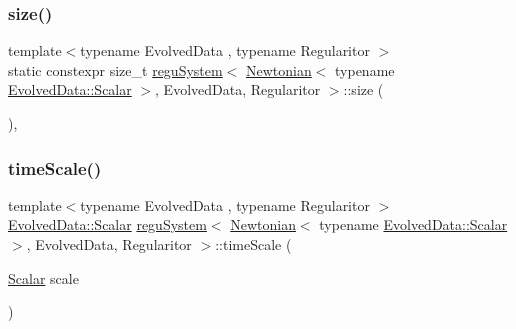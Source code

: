 \subsubsection{\texorpdfstring{size()}{size()}}
{\footnotesize\ttfamily template$<$typename Evolved\+Data , typename Regularitor $>$ \\
static constexpr size\+\_\+t \mbox{\hyperlink{classregu_system}{regu\+System}}$<$ \mbox{\hyperlink{class_newtonian}{Newtonian}}$<$ typename \mbox{\hyperlink{classregu_system_aca8ee2c387943164ee3ea68370fc3ac0}{Evolved\+Data\+::\+Scalar}} $>$, Evolved\+Data, Regularitor $>$\+::size (\begin{DoxyParamCaption}{ }\end{DoxyParamCaption})\hspace{0.3cm}{\ttfamily [inline]}, {\ttfamily [static]}}

\mbox{\label{classregu_system_3_01_newtonian_3_01typename_01_evolved_data_1_1_scalar_01_4_00_01_evolved_data_00_01_regularitor_01_4_adc3c44589517529c80470050edf5db0c}} 
\subsubsection{\texorpdfstring{time\+Scale()}{timeScale()}}
{\footnotesize\ttfamily template$<$typename Evolved\+Data , typename Regularitor $>$ \\
\mbox{\hyperlink{classregu_system_aca8ee2c387943164ee3ea68370fc3ac0}{Evolved\+Data\+::\+Scalar}} \mbox{\hyperlink{classregu_system}{regu\+System}}$<$ \mbox{\hyperlink{class_newtonian}{Newtonian}}$<$ typename \mbox{\hyperlink{classregu_system_aca8ee2c387943164ee3ea68370fc3ac0}{Evolved\+Data\+::\+Scalar}} $>$, Evolved\+Data, Regularitor $>$\+::time\+Scale (\begin{DoxyParamCaption}\item[{\mbox{\hyperlink{classregu_system_3_01_newtonian_3_01typename_01_evolved_data_1_1_scalar_01_4_00_01_evolved_data_00_01_regularitor_01_4_a6993f135075541f441a7642845b183a5}{Scalar}}}]{scale }\end{DoxyParamCaption})}

